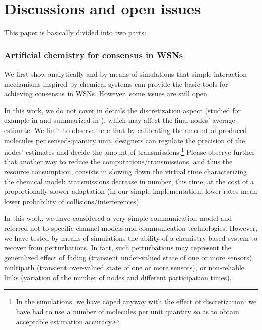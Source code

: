 \documentclass[journal]{IEEEtran}
\begin{document}
{\section{Discussions and open issues}\label{sec:Discussion}
{This paper is basically divided into two parts:}

\subsubsection{Artificial chemistry for consensus in WSNs}
{We first show analytically and by means of simulations that simple interaction mechanisms inspired by chemical systems can provide the basic tools for achieving consensus in WSNs. However, some issues are still open.}

{In this work, we do not cover in details the discretization aspect (studied for example in \cite{CaFa10} and summarized in \cite{DiKa10}), which may affect the final nodes' average-estimate. We limit to observe here that by calibrating the amount of produced molecules per sensed-quantity unit, designers can regulate the precision of the nodes' estimates and decide the amount of transmissions.\footnote{In the simulations, we have coped anyway with the effect of discretization: we have had to use a number of molecules per unit quantity so as to obtain acceptable estimation accuracy.} 
Please observe further that another way to reduce the computations/transmissions, and thus the {resource consumption}, consists in slowing down the virtual time characterizing the chemical model: transmissions decrease in number, this time, at the cost of a proportionally-slower adaptation (in our simple implementation, lower rates mean lower probability of collisions/interferences).}

{In this work, we have {considered a very simple communication model and referred not to} specific channel models and communication technologies. However, we have tested by means of simulations the ability of a chemistry-based system to recover from perturbations. In fact, such perturbations may represent the generalized effect of fading (transient under-valued state of one or more sensors), multipath (transient over-valued state of one or more sensors), or non-reliable links (variation of the number of nodes and different participation times).  
}

}
\end{document}
